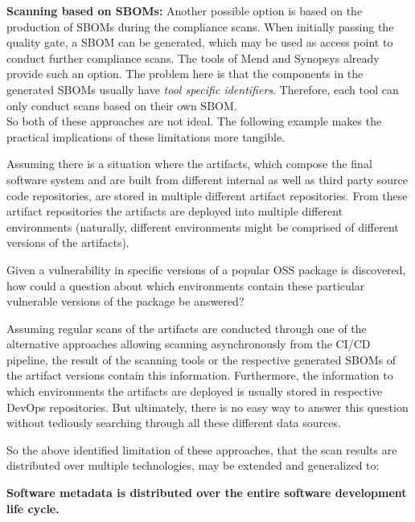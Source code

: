 \noindent\textbf{Scanning based on SBOMs:} 
Another possible option is based on the production of SBOMs during the compliance scans. When initially passing the quality gate, a SBOM can be generated, which may be used as access point to conduct further compliance scans. The tools of Mend and Synopsys already provide such an option. The problem here is that the components in the generated SBOMs usually have \emph{tool specific identifiers}. Therefore, each tool can only conduct scans based on their own SBOM.\\

\noindent So both of these approaches are not ideal. The following example makes the practical implications of these limitations more tangible.\par
Assuming there is a situation where the artifacts, which compose the final software system and are built from different internal as well as third party source code repositories, are stored in multiple different artifact repositories. From these artifact repositories the artifacts are deployed into multiple different environments (naturally, different environments might be comprised of different versions of the artifacts).\par
Given a vulnerability in specific versions of a popular OSS package is discovered, how could a question about which environments contain these particular vulnerable versions of the package be answered?\par
Assuming regular scans of the artifacts are conducted through one of the alternative approaches allowing scanning asynchronously from the CI/CD pipeline, the result of the scanning tools or the respective generated SBOMs of the artifact versions contain this information. Furthermore, the information to which environments the artifacts are deployed is usually stored in respective DevOps repositories. But ultimately, there is no easy way to answer this question without tediously searching through all these different data sources.\par
So the above identified limitation of these approaches, that the scan results are distributed over multiple technologies, may be extended and generalized to:\par
\textbf{Software metadata is distributed over the entire software development life cycle.}\\

